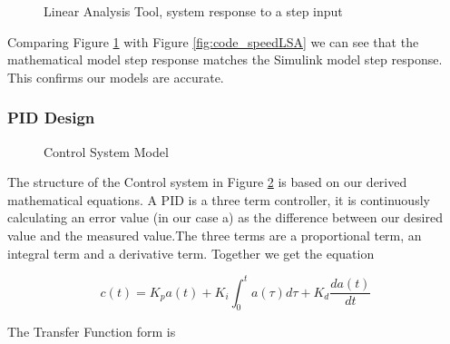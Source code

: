 \begin{figure}[H]
\centering
{}
\caption{\label{fig:SPEED_SIMU} Linear Analysis Tool, system response to a step input}
\end{figure}

\noindent Comparing Figure \ref{fig:SPEED_SIMU} with Figure \ref{fig:code_speedLSA} we can see that the mathematical model step response matches the Simulink model step response. This confirms our models are accurate.
    \subsubsection{PID Design}
    
\begin{figure}[H]
\centering
{}
\caption{\label{fig:SPEED_PID} Control System Model}
\end{figure}

\noindent The structure of the Control system in Figure \ref{fig:SPEED_PID} is based on our derived mathematical equations. A PID is a three term controller, it is continuously calculating an error value (in our case a) as the difference between our desired value and the measured value.The three terms are a proportional term, an integral term and a derivative term. Together we get the equation 

\begin{equation}
c(t) = K_{p}a(t) + K_{i}\int ^{t}_{0} a(\tau) d\tau + K_{d} \frac{da(t)}{dt}
\end{equation}

The Transfer Function form is 

